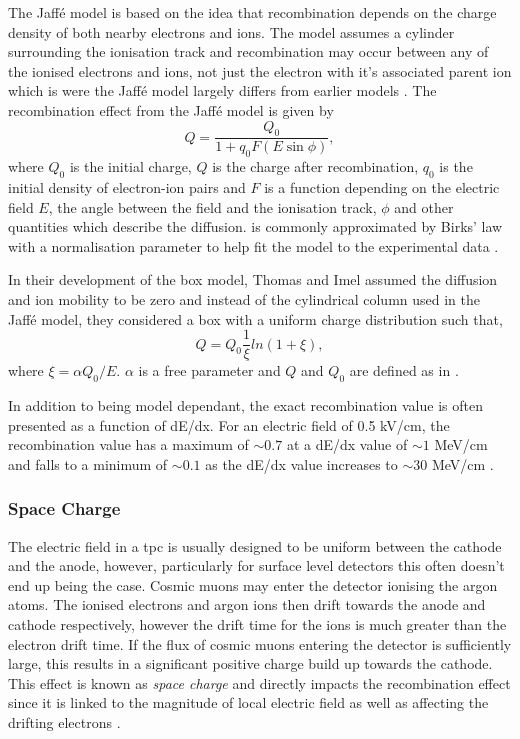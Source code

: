 The Jaff\'{e} model is based on the idea that recombination depends on the charge density of both nearby electrons and ions. The model assumes a cylinder surrounding the ionisation track and recombination may occur between any of the ionised electrons and ions, not just the electron with it's associated parent ion which is were the Jaff\'{e} model largely differs from earlier models \cite{Jaffe_model}. The recombination effect from the Jaff\'{e} model is given by 
\begin{equation}\label{Jaffe}
    Q = \frac{Q_{0}}{1+q_{0}F(E\sin{\phi})},
\end{equation}
where $Q_0$ is the initial charge, $Q$ is the charge after recombination, $q_0$ is the initial density of electron-ion pairs and $F$ is a function depending on the electric field $E$, the angle between the field and the ionisation track, $\phi$ and other quantities which describe the diffusion.  is commonly approximated by Birks' law with a normalisation parameter to help fit the model to the experimental data \cite{LArTPC_book}. 

In their development of the box model, Thomas and Imel assumed the diffusion and ion mobility to be zero and instead of the cylindrical column used in the Jaff\'{e} model, they considered a box with a uniform charge distribution such that, 
\begin{equation}
    Q = Q_{0}\frac{1}{\xi}ln(1+\xi),
\end{equation}
where $\xi = \alpha Q_0/E$. $\alpha$ is a free parameter and $Q$ and $Q_0$ are defined as in \cite{LArTPC_book}\cite{Recombination_box_model}.

In addition to being model dependant, the exact recombination value is often presented as a function of dE/dx. For an electric field of 0.5 kV/cm, the recombination value has a maximum of $\sim0.7$ at a dE/dx value of $\sim1$ MeV/cm and falls to a minimum of $\sim0.1$ as the dE/dx value increases to $\sim30$ MeV/cm \cite{LArTPC_book}.

\subsubsection{Space Charge}
The electric field in a \gls{tpc} is usually designed to be uniform between the cathode and the anode, however, particularly for surface level detectors this often doesn't end up being the case. Cosmic muons may enter the detector ionising the argon atoms. The ionised electrons and argon ions then drift towards the anode and cathode respectively, however the drift time for the ions is much greater than the electron drift time. If the flux of cosmic muons entering the detector is sufficiently large, this results in a significant positive charge build up towards the cathode. This effect is known as \textit{space charge} and directly impacts the recombination effect since it is linked to the magnitude of local electric field as well as affecting the drifting electrons \cite{microboone_sce}.

